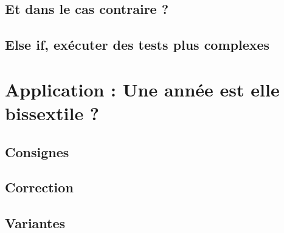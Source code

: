 \subsection{Et dans le cas contraire ?}
\subsection{Else if, exécuter des tests plus complexes}
\section{Application : Une année est elle bissextile ?}
\subsection{Consignes}
\subsection{Correction}
\subsection{Variantes}
